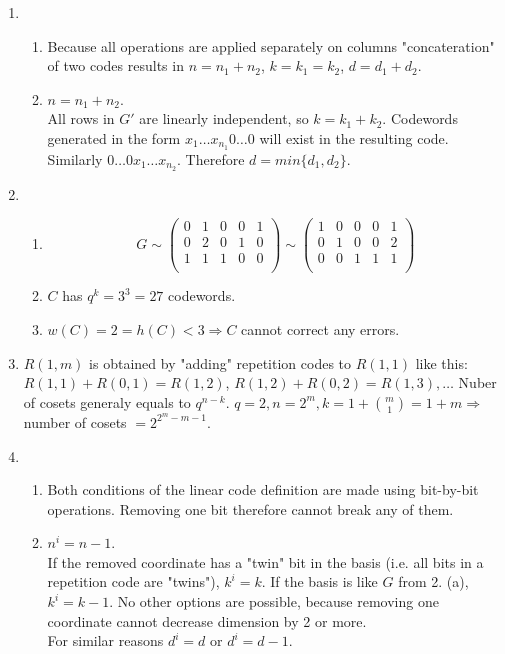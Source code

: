 \documentclass[a4paper,10pt]{article}
\begin{document}
\begin{enumerate}
\begin{enumerate}
    \end{enumerate}
  \item
    \begin{enumerate}
      \item
        Because all operations are applied separately on columns "concateration" of two codes results in $n=n_1+n_2$, $k=k_1=k_2$, $d=d_1+d_2$.
      \item
        $n=n_1+n_2$.\\
        All rows in $G'$ are linearly independent, so $k=k_1+k_2$.
        Codewords generated in the form $x_1\dots x_{n_1}0\dots 0$ will exist in the resulting code. 
        Similarly $0\dots 0x_1\dots x_{n_2}$. Therefore $d=min\{d_1, d_2\}$.
    \end{enumerate}
  \item
    \begin{enumerate}
      \item
        \[
          G\sim
          \begin{pmatrix}
            0&1&0&0&1\\
            0&2&0&1&0\\
            1&1&1&0&0\\
          \end{pmatrix}
          \sim
          \begin{pmatrix}
            1&0&0&0&1\\
            0&1&0&0&2\\
            0&0&1&1&1\\
          \end{pmatrix}
        \]
      \item
        $C$ has $q^k=3^3=27$ codewords.
      \item
        $w(C)=2=h(C)<3\Rightarrow C$ cannot correct any errors.
        
    \end{enumerate}

  \item
    $R(1,m)$ is obtained by "adding" repetition codes to $R(1,1)$ like this: $R(1,1)+R(0,1)=R(1,2)$, $R(1,2)+R(0,2)=R(1,3), \dots$
    Nuber of cosets generaly equals to $q^{n-k}$. $q=2, n=2^m, k=1+\binom{m}{1}=1+m\Rightarrow$ number of cosets $=2^{2^m-m-1}$.
  \item
    \begin{enumerate}
      \item
        Both conditions of the linear code definition are made using bit-by-bit operations. Removing one bit therefore cannot break any of them.
      \item
        $n^i=n-1$.\\
        If the removed coordinate has a "twin" bit in the basis (i.e. all bits in a repetition code are "twins"), $k^i=k$.
        If the basis is like $G$ from 2. (a),$k^i=k-1$. No other options are possible, because removing one coordinate cannot decrease dimension by 2 or more.\\
        For similar reasons $d^i=d$ or $d^i=d-1$.
        
    \end{enumerate}
\end{enumerate}
\end{document}
